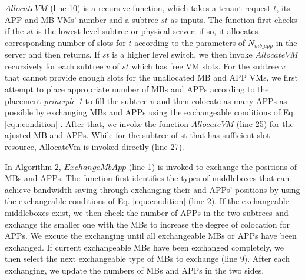 \documentclass[review]{elsarticle}
\begin{document}
$AllocateVM$ (line 10) is a recursive function, which takes a tenant request $t$, its APP and MB VMs’ number and a subtree $st$ as inputs. The function first checks if the $st$ is the lowest level subtree or physical server: if so, it allocates corresponding number of slots for $t$ according to the parameters of $N_{mb\_app}$ in the server and then returns. If $st$ is a higher level switch, we then invoke $AllocateVM$ recursively for each subtree $v$ of $st$ which has free VM slots. For the subtree $v$ that cannot provide enough slots for the unallocated MB and APP VMs, we first attempt to place appropriate number of MBs and APPs according to the placement \emph{principle 1} to fill the subtree $v$ and then colocate as many APPs as possible by exchanging MBs and APPs using the exchangeable conditions of Eq. \ref{equ:condition} . After that, we invoke the function $AllocateVM$ (line 25) for the ajusted MB and APPs. While for the subtree of st that has sufficient slot resource, AllocateVm is invoked directly (line 27). 

In Algorithm 2, $ExchangeMbApp$ (line 1) is invoked to exchange the positions of MBs and APPs. The function first identifies the types of middleboxes that can achieve bandwidth saving through exchanging their and APPs' positions by using the exchangeable conditions of Eq. \ref{equ:condition} (line 2). If the exchangeable middleboxes exist, we then check the number of APPs in the two subtrees and exchange the smaller one with the MBs to increase the degree of colocation for APPs. We excute the exchanging until all exchangeable MBs or APPs have been exchanged. If current exchangeable MBs have been exchanged completely, we then select the next exchangeable type of MBs to exchange (line 9). After each exchanging, we update the numbers of MBs and APPs in the two sides.

\end{document}
